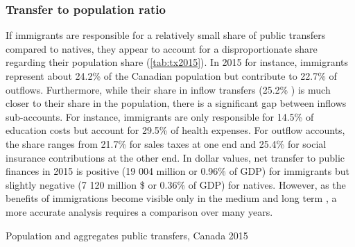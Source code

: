 \subsubsection*{Transfer to population ratio}
If immigrants are responsible for a relatively small share of public transfers compared to natives, they appear to account for a disproportionate share regarding their population share (\autoref{tab:tx2015}).
In 2015 for instance, immigrants represent about 24.2\% of the Canadian population but contribute to 22.7\% of outflows.
Furthermore, while their share in inflow transfers (25.2\% ) is much closer to their share in the population, there is a significant gap between inflows sub-accounts.
For instance, immigrants are only responsible for 14.5\% of education costs but account for 29.5\% of health expenses.
For outflow accounts, the share ranges from 21.7\% for sales taxes at one end and 25.4\% for social insurance contributions at the other end.
In dollar values, net transfer to public finances in 2015 is positive (19 004 million or 0.96\% of GDP) for immigrants but slightly negative (7 120 million \$ or 0.36\% of GDP) for natives.
However, as the benefits of immigrations become visible only in the medium and long term \citep{Goldin:2011tg}, a more accurate analysis requires a comparison over many years.

  \begin{table}[H]%
    \caption{Population and aggregates public transfers, Canada 2015}
    \label{tab:tx2015}%
    \begin{center}
   \end{center}
\end{table}%

